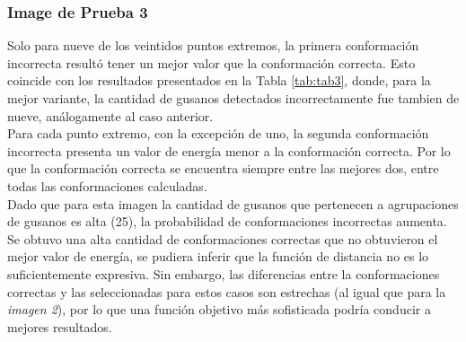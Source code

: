 \subsubsection*{Image de Prueba 3}

Solo para nueve de los veintidos puntos extremos, la primera conformaci\'on
incorrecta result\'o tener un mejor valor que la conformaci\'on correcta.
Esto coincide con los resultados presentados en la Tabla \ref{tab:tab3},
donde, para la mejor variante, la cantidad de gusanos detectados incorrectamente
fue tambien de nueve, an\'alogamente al caso anterior.\\
Para cada punto extremo, con la excepci\'on de uno, la segunda conformaci\'on
incorrecta presenta un valor de energ\'ia menor a la conformaci\'on correcta.
Por lo que la conformaci\'on correcta se encuentra siempre
entre las mejores dos, entre todas las conformaciones calculadas.\\

Dado que para esta imagen la cantidad de gusanos que pertenecen a agrupaciones
de gusanos es alta (25), la probabilidad de conformaciones
incorrectas aumenta. Se obtuvo una alta cantidad de conformaciones correctas 
que no obtuvieron el mejor valor de energ\'ia, se pudiera inferir que la funci\'on de distancia
no es lo suficientemente expresiva. Sin embargo, las diferencias entre la
conformaciones correctas y las seleccionadas para estos casos son estrechas
(al igual que para la \emph{imagen 2}), por lo que una funci\'on objetivo
m\'as sofisticada podr\'ia conducir a mejores resultados.
